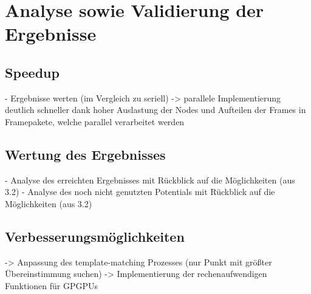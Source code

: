 \chapter{Analyse sowie Validierung der Ergebnisse}

\section{Speedup}

\begin{correctmore}
	- Ergebnisse werten (im Vergleich zu seriell)
	-> parallele Implementierung deutlich schneller dank hoher Auslastung der Nodes und Aufteilen der Frames in Framepakete, welche parallel verarbeitet werden
\end{correctmore}
\section{Wertung des Ergebnisses}

\begin{correctmore}
	- Analyse des erreichten Ergebnisses mit Rückblick auf die Möglichkeiten (aus 3.2)
	- Analyse des noch nicht genutzten Potentials mit Rückblick auf die Möglichkeiten (aus 3.2)
\end{correctmore}

\section{Verbesserungsmöglichkeiten}

\begin{correctmore}
	-> Anpassung des template-matching Prozesses (nur Punkt mit größter Übereinstimmung suchen)
	-> Implementierung der rechenaufwendigen Funktionen für GPGPUs
\end{correctmore}